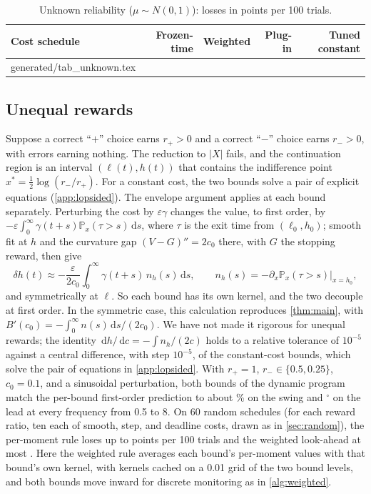\documentclass[11pt]{article}
\makeatletter
\newcommand\inputrows[1]{\@@input #1 }
\theoremstyle{definition}
\theoremstyle{remark}
\renewcommand{\P}{\mathbb{P}}
\newcommand{\dd}{\,\mathrm{d}}
\makeatother
\begin{document}
\begin{table}[t]
  \centering
  \caption{Unknown reliability ($\mu \sim N(0, 1)$): losses in points per 100 trials.}
  \label{tab:unknown}
  \begin{tabular}{lrrrr}
    \toprule
    Cost schedule & Frozen-time & Weighted & Plug-in & Tuned constant \\
    \midrule
    \inputrows{generated/tab_unknown.tex}
    \bottomrule
  \end{tabular}
\end{table}

\subsection{Unequal rewards}
\label{sec:lopsided}

Suppose a correct ``$+$'' choice earns $r_+ > 0$ and a correct ``$-$'' choice earns $r_- > 0$,
with errors earning nothing. The reduction to $|X|$ fails, and the continuation region is an interval
$(\ell(t), h(t))$ that contains the indifference point $x^* = \tfrac12\log(r_-/r_+)$. For a
constant cost, the two bounds solve a pair of explicit equations (\cref{app:lopsided}). The envelope argument
applies at each bound separately. Perturbing the cost by $\varepsilon\gamma$ changes the value, to
first order, by $-\varepsilon\int_0^\infty\gamma(t+s)\P_x(\tau > s)\dd s$, where $\tau$ is the exit
time from $(\ell_0, h_0)$; smooth fit at $h$ and the curvature gap $(V - G)'' = 2c_0$ there, with
$G$ the stopping reward, then give
\begin{equation}
  \delta h(t) \approx -\frac{\varepsilon}{2c_0}\int_0^\infty \gamma(t+s)\, n_h(s)\dd s,
  \qquad n_h(s) = -\partial_x \P_x(\tau > s)\big|_{x = h_0},
\end{equation}
and symmetrically at $\ell$. So each bound has its own kernel, and the two decouple at first
order. In the symmetric case, this calculation reproduces \cref{thm:main}, with
$B'(c_0) = -\int_0^\infty n(s)\dd s/(2c_0)$. We have not made it rigorous for unequal rewards; the
identity $\dd h/\dd c = -\int n_h/(2c)$ holds to a relative tolerance of $10^{-5}$ against a central
difference, with step $10^{-5}$, of the constant-cost bounds, which solve the pair of equations in
\cref{app:lopsided}. With $r_+ = 1$, $r_- \in \{0.5, 0.25\}$, $c_0 = 0.1$, and a sinusoidal
perturbation, both bounds of the dynamic program match the per-bound first-order prediction to about
\LopsidedWorstGain\% on the swing and \LopsidedWorstLead$^\circ$ on the lead at every frequency
from 0.5 to 8. On 60 random schedules (for each reward ratio, ten each of smooth, step, and deadline costs,
drawn as in \cref{sec:random}), the per-moment rule loses up to \LopsidedPerMomentMax{} points per
100 trials and the weighted look-ahead at most \LopsidedWeightedMax. Here the weighted rule
averages each bound's per-moment values with that bound's own kernel, with kernels cached on a
0.01 grid of the two bound levels, and both bounds move inward for discrete monitoring as in
\cref{alg:weighted}.
\end{document}
